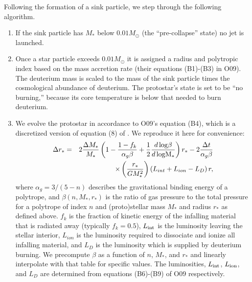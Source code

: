 \documentclass[../dissertation.tex]{subfiles}
\begin{document}


Following the formation of a sink particle, we step through the following algorithm. %
\begin{enumerate}
 \item If the sink particle has $M_*$ below $0.01 M_{\odot}$ (the ``pre-collapse'' state) no jet is launched.
 \item Once a star particle exceeds $0.01 M_{\odot}$ it is assigned a radius and polytropic index based on the mass accretion rate (their equations (B1)-(B3) in O09).
The deuterium mass is scaled to the mass of the sink particle times the cosmological abundance of deuterium.
The protostar's state is set to be ``no burning,'' because its core temperature is below that needed to burn deuterium.
 \item We evolve the protostar in accordance to O09's equation (B4), which is a discretized version of equation (8) of \citet{2000ApJ...534..976N}.
We reproduce it here for convenience:
 \begin{eqnarray}
\label{eq:jet_deltaR}
\Delta r_* &=& 2 \frac{\Delta M_*}{M_*} \left( 1 - \frac{1 - f_k}{\alpha_g \beta} + \frac{1}{2} \frac{d\, \rm{log} \beta}{d\, \rm{log} M_*} \right) r_* - 2 \frac{\Delta t}{\alpha_g \beta} \nonumber\\
&&\times \left( \frac{r_*}{G M_*^2} \right) \left( L_{int} + L_{ion} - L_D \right) r,
\end{eqnarray}
where $\alpha_g = 3/(5 - n)$ describes the gravitational binding energy of a polytrope, and $\beta(n, M_*, r_*)$ is the ratio of gas pressure to the total pressure for a polytrope of index $n$ and (proto)stellar mass $M_*$ and radius $r_*$ as defined above.
$f_k$ is the fraction of kinetic energy of the infalling material that is radiated away (typically $f_k = 0.5$), $L_{\rm int}$ is the luminosity leaving the stellar interior, $L_{ion}$ is the luminosity required to dissociate and ionize all infalling material, and $L_D$ is the luminosity which is supplied by deuterium burning.
We precompute $\beta$ as a function of $n$, $M_*$, and $r_*$ and linearly interpolate with that table for specific values. The luminosities, $L_{\rm int}$, $L_{\rm ion}$, and $L_D$ are determined from equations (B6)-(B9) of O09 respectively.

\end{enumerate}
\end{document}
